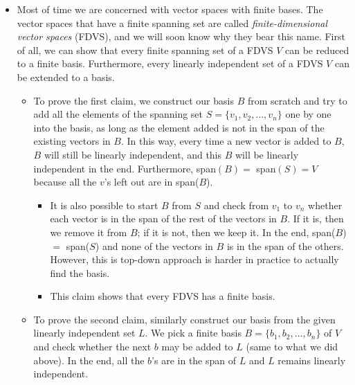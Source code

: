 \documentclass{article}
\begin{document}
\begin{itemize}
    \item Most of time we are concerned with vector spaces with finite bases. The vector spaces that have a finite spanning set are called \textit{finite-dimensional vector spaces} (FDVS), and we will soon know why they bear this name. First of all, we can show that every finite spanning set of a FDVS $V$ can be reduced to a finite basis. Furthermore, every linearly independent set of a FDVS $V$ can be extended to a basis.
    \begin{itemize}
        \item To prove the first claim, we construct our basis $B$ from scratch and try to add all the elements of the spanning set $S = \{v_1, v_2, \dots, v_n\}$ one by one into the basis, as long as the element added is not in the span of the existing vectors in $B$. In this way, every time a new vector is added to $B$, $B$ will still be linearly independent, and this $B$ will be linearly independent in the end. Furthermore, span$(B) = $ span$(S) = V$ because all the $v$'s left out are in span($B$).
        \begin{itemize}
            \item It is also possible to start $B$ from $S$ and check from $v_1$ to $v_n$ whether each vector is in the span of the rest of the vectors in $B$. If it is, then we remove it from $B$; if it is not, then we keep it. In the end, span($B$) $=$ span($S$) and none of the vectors in $B$ is in the span of the others. However, this is top-down approach is harder in practice to actually find the basis.
            \item This claim shows that every FDVS has a finite basis.
        \end{itemize}
        \item To prove the second claim, similarly construct our basis from the given linearly independent set $L$. We pick a finite basis $B = \{b_1, b_2,\dots,b_n\}$ of $V$ and check whether the next $b$ may be added to $L$ (same to what we did above). In the end, all the $b$'s are in the span of $L$ and $L$ remains linearly independent.
    \end{itemize}
    

\end{itemize}
\end{document}
